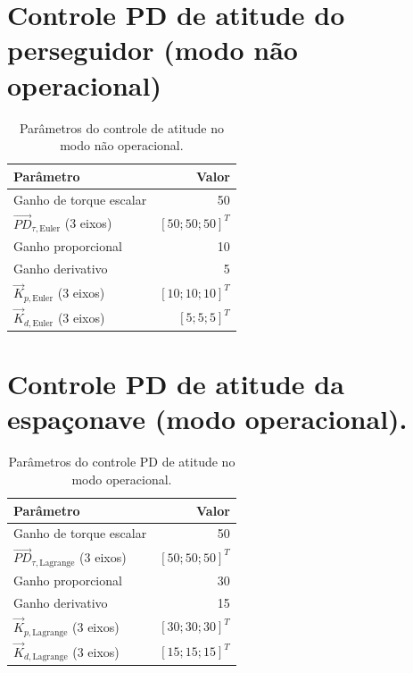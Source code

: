 
\section{Controle PD de atitude do perseguidor (modo não operacional)}
\label{apC_pd_euler}

\begin{table}[H]
\centering
\caption{Parâmetros do controle de atitude no modo não operacional.}
\label{ttab_apC_pd_euler}
\begin{tabular}{lr}
\toprule
\textbf{Parâmetro} & \textbf{Valor} \\
\midrule
Ganho de torque escalar & 50 \\
$\vec{PD}_{\tau,\text{Euler}}$ (3 eixos) & $[50;50;50]^T$ \\
Ganho proporcional & 10 \\
Ganho derivativo & 5 \\
$\vec{K}_{p,\text{Euler}}$ (3 eixos) & $[10;10;10]^T$ \\
$\vec{K}_{d,\text{Euler}}$ (3 eixos) & $[5;5;5]^T$ \\
\bottomrule
\end{tabular}
\end{table}


\section{Controle PD de atitude da espaçonave (modo operacional).}
\label{apC_pd_lagrange}


\begin{table}[H]
\centering
\caption{Parâmetros do controle PD de atitude no modo operacional.}
\label{ttab_apC_pd_lagrange}
\begin{tabular}{lr}
\toprule
\textbf{Parâmetro} & \textbf{Valor} \\
\midrule
Ganho de torque escalar & 50 \\
$\vec{PD}_{\tau,\text{Lagrange}}$ (3 eixos) & $[50;50;50]^T$ \\
Ganho proporcional & 30 \\
Ganho derivativo & 15 \\
$\vec{K}_{p,\text{Lagrange}}$ (3 eixos) & $[30;30;30]^T$ \\
$\vec{K}_{d,\text{Lagrange}}$ (3 eixos) & $[15;15;15]^T$ \\
\bottomrule
\end{tabular}
\end{table}

